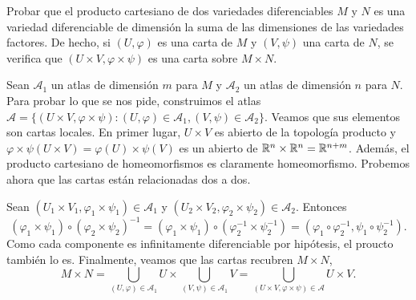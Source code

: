 \documentclass[twoside]{article}
\begin{document}
\begin{ejercicio}{7}
Probar que el producto cartesiano de dos variedades diferenciables $M$ y $N$
es una variedad diferenciable de dimensión la suma de las dimensiones de
las variedades factores. De hecho, si $(U,\varphi)$ es una carta de $M$ y $(V,\psi )$ una
carta de $N$, se verifica que $(U \times V,\varphi\times\psi )$ es una carta sobre $M \times N$.
\end{ejercicio}
\begin{solucion}
Sean $\mathcal{A}_1$ un atlas de dimensión $m$ para $M$ y $\mathcal{A}_2$ un atlas de dimensión $n$ para $N$. Para probar lo que se nos pide, construimos el atlas $\mathcal{A}=\{(U\times V,\varphi\times\psi): (U,\varphi)\in\mathcal{A}_1, (V,\psi)\in\mathcal{A}_2\}$. Veamos que sus elementos son cartas locales. En primer lugar, $U\times V$ es abierto de la topología producto y $\varphi\times\psi(U\times V)=\varphi(U)\times\psi(V)$ es un abierto de $\mathbb{R}^n\times\mathbb{R}^n=\mathbb{R}^{n+m}$. Además, el producto cartesiano de homeomorfismos es claramente homeomorfismo. Probemos ahora que las cartas están relacionadas dos a dos. 

Sean $(U_1\times V_1,\varphi_1\times\psi_1)\in\mathcal{A}_1$ y $(U_2\times V_2,\varphi_2\times\psi_2)\in\mathcal{A}_2$. Entonces 
$$(\varphi_1\times\psi_1)\circ(\varphi_2\times\psi_2)^{-1}=(\varphi_1\times\psi_1)\circ(\varphi_2^{-1}\times\psi_2^{-1})=(\varphi_1\circ\varphi_2^{-1},\psi_1\circ\psi_2^{-1}).$$
Como cada componente es infinitamente diferenciable por hipótesis, el proucto también lo es. Finalmente, veamos que las cartas recubren $M\times N$,
$$M\times N= \bigcup_{(U,\varphi)\in\mathcal{A}_1}U\times\bigcup_{(V,\psi)\in\mathcal{A}_1}V=\bigcup_{(U\times V,\varphi\times\psi)\in\mathcal{A}}U\times V.$$
\end{solucion}
\end{document}

